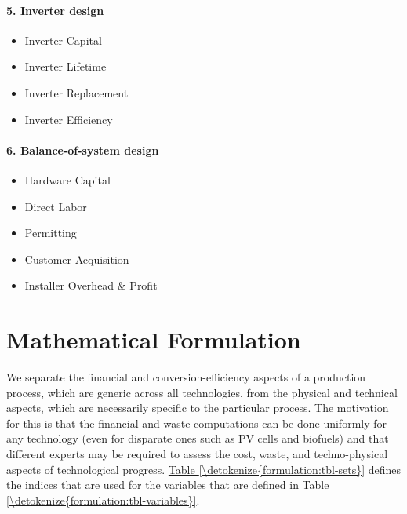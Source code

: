 \documentclass[letterpaper,10pt,english]{sphinxmanual}
\begin{document}
\subsubsection{5. Inverter design}
\label{\detokenize{approach:inverter-design}}\begin{itemize}
\item {} 
Inverter Capital

\item {} 
Inverter Lifetime

\item {} 
Inverter Replacement

\item {} 
Inverter Efficiency

\end{itemize}


\subsubsection{6. Balance-of-system design}
\label{\detokenize{approach:balance-of-system-design}}\begin{itemize}
\item {} 
Hardware Capital

\item {} 
Direct Labor

\item {} 
Permitting

\item {} 
Customer Acquisition

\item {} 
Installer Overhead \& Profit

\end{itemize}


\chapter{Mathematical Formulation}
\label{\detokenize{formulation:mathematical-formulation}}\label{\detokenize{formulation:sec-formulation}}\label{\detokenize{formulation::doc}}
We separate the financial and conversion-efficiency aspects of a
production process, which are generic across all technologies, from the
physical and technical aspects, which are necessarily specific to the
particular process. The motivation for this is that the financial and
waste computations can be done uniformly for any technology (even for
disparate ones such as PV cells and biofuels) and that different experts
may be required to assess the cost, waste, and techno-physical aspects
of technological progress. \hyperref[\detokenize{formulation:tbl-sets}]{Table \ref{\detokenize{formulation:tbl-sets}}} defines the indices that are used
for the variables that are defined in \hyperref[\detokenize{formulation:tbl-variables}]{Table \ref{\detokenize{formulation:tbl-variables}}}.
\end{document}
